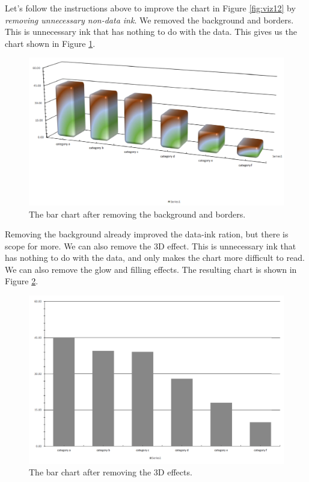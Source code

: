 \documentclass[]{book}
\begin{document}
Let's follow the instructions above to improve the chart in Figure \ref{fig:viz12} by \emph{removing unnecessary non-data ink}. We removed the background and borders. This is unnecessary ink that has nothing to do with the data. This gives us the chart shown in Figure \ref{fig:viz13}.

\begin{figure}

{\centering \includegraphics[width=0.7\linewidth]{_resources/chapter_viz/ex0_2} 

}

\caption{The bar chart after removing the background and borders.}\label{fig:viz13}
\end{figure}

Removing the background already improved the data-ink ration, but there is scope for more. We can also remove the 3D effect. This is unnecessary ink that has nothing to do with the data, and only makes the chart more difficult to read. We can also remove the glow and filling effects. The resulting chart is shown in Figure \ref{fig:viz14}.

\begin{figure}

{\centering \includegraphics[width=0.7\linewidth]{_resources/chapter_viz/ex0_4} 

}

\caption{The bar chart after removing the 3D effects.}\label{fig:viz14}
\end{figure}
\end{document}
